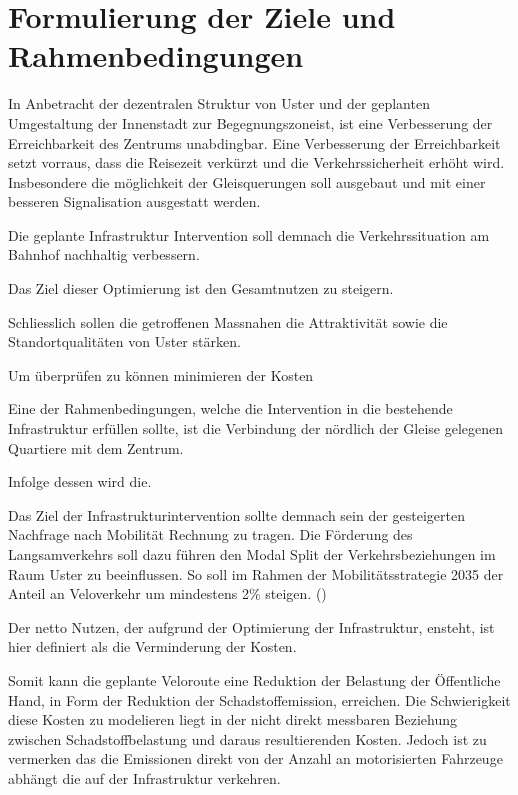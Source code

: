 \pagebreak

\section{Formulierung der Ziele und Rahmenbedingungen}
\label{sec:Zielformulierung}

In Anbetracht der dezentralen Struktur von Uster und der geplanten Umgestaltung der Innenstadt zur Begegnungszoneist, ist eine Verbesserung der Erreichbarkeit des Zentrums unabdingbar. Eine Verbesserung der Erreichbarkeit setzt vorraus, dass die Reisezeit verkürzt und die Verkehrssicherheit erhöht wird. Insbesondere die möglichkeit der Gleisquerungen soll ausgebaut und mit einer besseren Signalisation ausgestatt werden. 


Die geplante Infrastruktur Intervention soll demnach die Verkehrssituation am Bahnhof nachhaltig verbessern.

Das Ziel dieser Optimierung ist den Gesamtnutzen zu steigern.
 

Schliesslich sollen die getroffenen Massnahen die Attraktivität sowie die Standortqualitäten von Uster stärken.

Um überprüfen zu können minimieren der Kosten
 
Eine der Rahmenbedingungen, welche die Intervention in die bestehende Infrastruktur erfüllen sollte, ist die Verbindung der nördlich der Gleise gelegenen Quartiere mit dem Zentrum. 

 
Infolge dessen wird die.



Das Ziel der Infrastrukturintervention sollte demnach sein der gesteigerten Nachfrage nach Mobilität Rechnung zu tragen. Die Förderung des Langsamverkehrs soll dazu führen den Modal Split der Verkehrsbeziehungen im Raum Uster zu beeinflussen. So soll im Rahmen der Mobilitätsstrategie 2035 der Anteil an Veloverkehr um mindestens 2\% steigen. (\cite{STEK})

Der netto Nutzen, der aufgrund der Optimierung der Infrastruktur, ensteht, ist hier definiert als die Verminderung der Kosten.

Somit kann die geplante Veloroute eine Reduktion der Belastung der Öffentliche Hand, in Form der Reduktion der Schadstoffemission, erreichen. 	
Die Schwierigkeit diese Kosten zu modelieren liegt in der nicht direkt messbaren Beziehung zwischen Schadstoffbelastung und daraus resultierenden Kosten. Jedoch ist zu vermerken das die Emissionen direkt von der Anzahl an motorisierten Fahrzeuge abhängt die auf der Infrastruktur verkehren.

